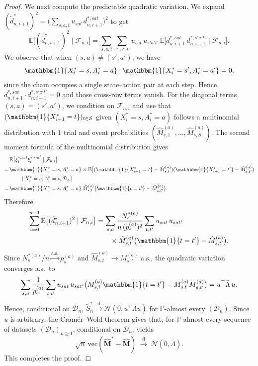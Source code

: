 \documentclass{article}
\numberwithin{equation}{section}
\newcommand{\indicator}{\mathbbm{1}}
\begin{document}
\begin{proof}
We next compute the predictable quadratic variation. We expand $(\tilde d_{n,i+1}^\ast)^2 = \bigl(\sum_{s,a,t}u_{sat}\,d_{n,i+1}^{\ast,sat}\bigr)^2$ to get
\[
\mathbb{E}\bigl[(\tilde d_{n,i+1}^\ast)^2\mid\mathcal{F}_{n,i}\bigr]
= \sum_{s,a,t}\sum_{s',a',t'}u_{sat}\,u_{s'a't'}\,\mathbb{E}\bigl[d_{n,i+1}^{\ast,sat}\,d_{n,i+1}^{\ast,s'a't'}\mid\mathcal{F}_{n,i}\bigr].
\]
We observe that when $(s,a)\ne(s',a')$, we have
\[
\indicator\{X_i^\ast=s,A_i^\ast=a\}\cdot\indicator\{X_i^\ast=s',A_i^\ast=a'\}=0,
\]
since the chain occupies a single state--action pair at each step. Hence $d_{n,i+1}^{\ast,sat}\cdot d_{n,i+1}^{\ast,s'a't'}=0$ and those cross-row terms vanish. For the diagonal terms $(s,a)=(s',a')$, we condition on $\mathcal{F}_{n,i}$ and use that $(\indicator\{X_{i+1}^\ast=t\})_{t\in\mathcal{S}}$ given $(X_i^\ast=s,A_i^\ast=a)$ follows a multinomial distribution with $1$ trial and event probabilities $(\hat M_{s,1}^{(a)},\ldots,\hat M_{s,S}^{(a)})$.
The second moment formula of the multinomial distribution gives
\begin{align*}
& \mathbb{E}\bigl[\xi_i^{\ast,sat}\xi_i^{\ast,sat'}\mid\mathcal{F}_{n,i}\bigr] \\
= \, & \indicator\{X_i^\ast=s,A_i^\ast=a\} \times\mathbb{E}\bigl[(\indicator\{X_{i+1}^\ast=t\}-\hat M_{s,t}^{(a)})(\indicator\{X_{i+1}^\ast=t'\}-\hat M_{s,t'}^{(a)}) \\
& \qquad\mid X_i^\ast=s,A_i^\ast=a,\mathcal{D}_n\bigr]\\
= \, & \indicator\{X_i^\ast=s,A_i^\ast=a\}\,\hat M_{s,t}^{(a)}\bigl(\indicator\{t=t'\}-\hat M_{s,t'}^{(a)}\bigr).
\end{align*}
Therefore
\begin{align*}
\sum_{i=0}^{n-1}\mathbb{E}\bigl[(\tilde d_{n,i+1}^\ast)^2\mid\mathcal{F}_{n,i}\bigr]
&=\sum_{s,a}\frac{N_s^{\ast(a)}}{n\,(p_s^{(a)})^2}
\sum_{t,t'}u_{sat}\,u_{sat'} \\
&\qquad \times \hat M_{s,t}^{(a)}
\bigl(\indicator\{t=t'\}-\hat M_{s,t'}^{(a)}\bigr).
\end{align*}
Since $N_s^{\ast(a)}/n\xrightarrow{\mathrm{a.s.}}p_s^{(a)}$ and $\hat M_{s,t}^{(a)}\to M_{s,t}^{(a)}$ a.s., the quadratic variation converges a.s.\ to
\[
\sum_{s,a}\frac{1}{p_s^{(a)}}
\sum_{t,t'}u_{sat}\,u_{sat'}\bigl(M_{s,t}^{(a)}\indicator\{t=t'\}-M_{s,t}^{(a)}M_{s,t'}^{(a)}\bigr)
= u^\top\bar\Lambda\, u.
\]
Hence, conditional on $\mathcal{D}_n$, $\tilde S_n^\ast\xrightarrow{\mathrm{d}}\mathcal{N}(0,u^\top\bar\Lambda u)$ for $\mathbb{P}$-almost every $(\mathcal{D}_n)$. Since $u$ is arbitrary, the Cram\'{e}r--Wold theorem gives that, for $\mathbb{P}$-almost every sequence of datasets $(\mathcal{D}_n)_{n\ge 1}$, conditional on $\mathcal{D}_n$, yields
\[
\sqrt{n}\,\mathrm{vec}(\hat{\mathbf{M}}^\ast-\hat{\mathbf{M}})
\;\xrightarrow{\mathrm{d}}\;\mathcal{N}(0,\bar\Lambda).
\]
This completes the proof.
\end{proof}
\end{document}
